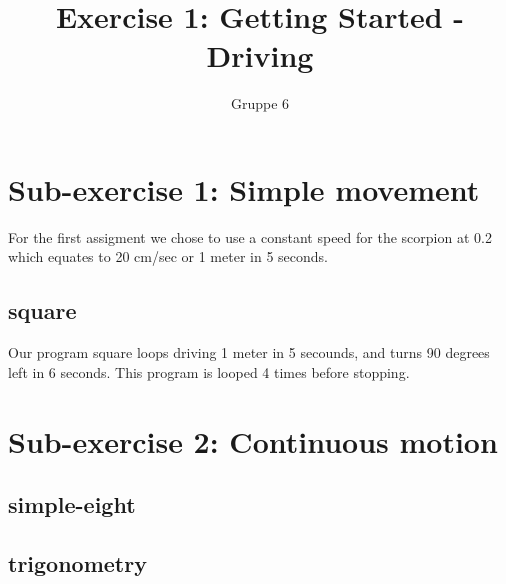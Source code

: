 \documentclass[a4paper,12pt]{article}
\title{Exercise 1: Getting Started - Driving}
\author{Gruppe 6}
\begin{document}
\maketitle

\section{ Sub-exercise 1: Simple movement}

For the first assigment we chose to use a constant speed for the scorpion at 0.2 which equates to 20 cm/sec or 1 meter in 5 seconds.

\subsection{square}

Our program square loops driving 1 meter in 5 secounds,  and turns 90 degrees left in 6 seconds. This program is looped 4 times before stopping.

\section{ Sub-exercise 2: Continuous motion}

\subsection{simple-eight}

\subsection{trigonometry}
\end{document}
